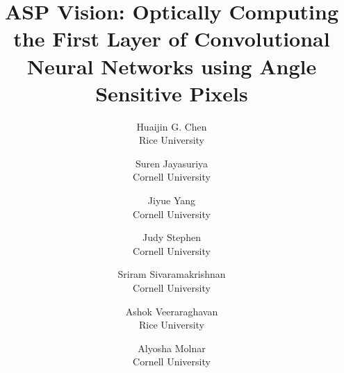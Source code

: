 \documentclass[10pt,twocolumn,letterpaper]{article}
\begin{document}
\title{ASP Vision: Optically Computing the First Layer of Convolutional Neural Networks using Angle Sensitive Pixels}

%

\author{Huaijin G. Chen\footnotemark[1]\\
Rice University\\
\and
Suren Jayasuriya\footnotemark[1]\\
Cornell University\\
\and
Jiyue Yang\\
Cornell University\\
\and
Judy Stephen\\
Cornell University\\
\and
Sriram Sivaramakrishnan\\
Cornell University\\
\and
Ashok Veeraraghavan\\
Rice University\\
\and
Alyosha Molnar\\
Cornell University\\
}
\end{document}
